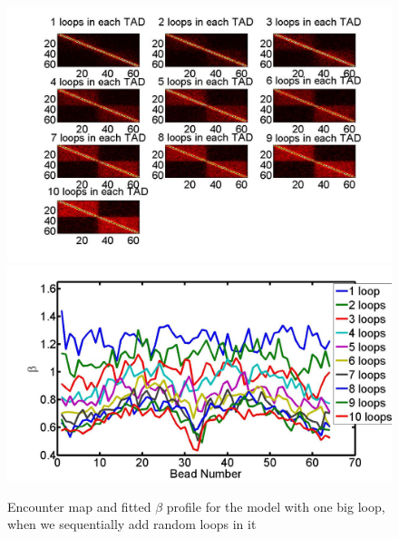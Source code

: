 \documentclass[12pt]{paper}
\begin{document}
\begin{figure}[H]
\includegraphics[scale=0.2]{encounterHistogram1To10LoopsInEachTAD}
\includegraphics[scale=0.2]{fittedExpTwoTADs1To10Loops}
\caption{Encounter map and fitted $\beta$ profile for the model with one big loop, when we sequentially add random loops in it}
\label{figure_randomLoopsTwoTADs}
\end{figure}



\end{document}
